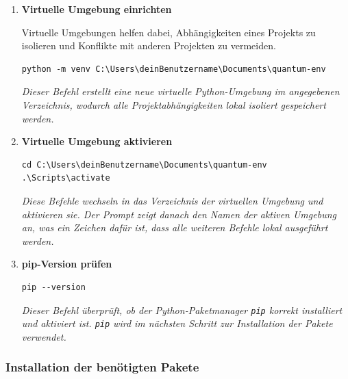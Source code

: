 \begin{enumerate}
    \item \textbf{Virtuelle Umgebung einrichten} 
    
Virtuelle Umgebungen helfen dabei, Abhängigkeiten eines Projekts zu isolieren und Konflikte mit anderen Projekten zu vermeiden.
    \begin{verbatim}
python -m venv C:\Users\deinBenutzername\Documents\quantum-env
    \end{verbatim}
\textit{Dieser Befehl erstellt eine neue virtuelle Python-Umgebung im angegebenen Verzeichnis, wodurch alle Projektabhängigkeiten lokal isoliert gespeichert werden. }
   

 \item \textbf{Virtuelle Umgebung aktivieren}
    \begin{verbatim}
cd C:\Users\deinBenutzername\Documents\quantum-env
.\Scripts\activate
    \end{verbatim}
\textit{Diese Befehle wechseln in das Verzeichnis der virtuellen Umgebung und aktivieren sie.  Der Prompt zeigt danach den Namen der aktiven Umgebung an, was ein Zeichen dafür ist, dass alle weiteren Befehle lokal ausgeführt werden. }
  

    \item \textbf{pip-Version prüfen}
    \begin{verbatim}
pip --version
    \end{verbatim}
\textit{Dieser Befehl überprüft, ob der Python-Paketmanager \texttt{pip} korrekt installiert und aktiviert ist.  \texttt{pip} wird im nächsten Schritt zur Installation der Pakete verwendet. }
    
\end{enumerate}

\subsubsection*{Installation der benötigten Pakete}

